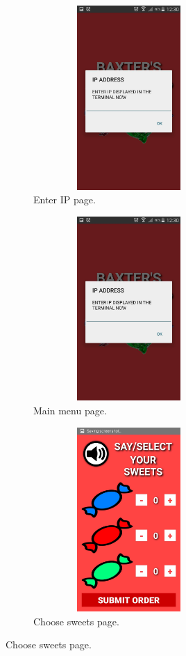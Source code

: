 \begin{figure}[H]
    \captionsetup[subfigure]{justification=centering}
    \begin{subfigure}[H]{0.325\textwidth}   
        \centering 
        \includegraphics[width=0.8\textwidth, height=7cm]{ipbootpage.png}
        \caption{Enter IP page.}
        \label{fig:TimeGrasp}
    \end{subfigure}
    \begin{subfigure}[H]{0.325\textwidth}   
        \centering 
        \includegraphics[width=0.8\textwidth, height=7cm]{ipbootpage.png}
        \caption{Main menu page.}
        \label{fig:TimeGrasp}
    \end{subfigure}
    \begin{subfigure}[H]{0.325\textwidth}   
        \centering 
        \includegraphics[width=0.8\textwidth, height=7cm]{sweetchoicepage.png}
        \caption{Choose sweets page.}
        \label{fig:TimeGrasp}
    \end{subfigure}
\end{figure}

